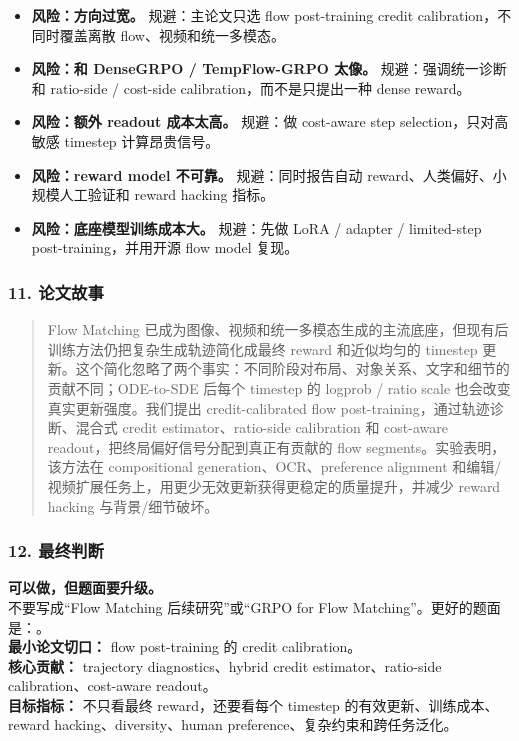 \begin{itemize}[leftmargin=1.5em]
  \item \textbf{风险：方向过宽。} 规避：主论文只选 flow post-training credit calibration，不同时覆盖离散 flow、视频和统一多模态。
  \item \textbf{风险：和 DenseGRPO / TempFlow-GRPO 太像。} 规避：强调统一诊断和 ratio-side / cost-side calibration，而不是只提出一种 dense reward。
  \item \textbf{风险：额外 readout 成本太高。} 规避：做 cost-aware step selection，只对高敏感 timestep 计算昂贵信号。
  \item \textbf{风险：reward model 不可靠。} 规避：同时报告自动 reward、人类偏好、小规模人工验证和 reward hacking 指标。
  \item \textbf{风险：底座模型训练成本大。} 规避：先做 LoRA / adapter / limited-step post-training，并用开源 flow model 复现。
\end{itemize}

\subsubsection*{11. 论文故事}

\begin{quote}
Flow Matching 已成为图像、视频和统一多模态生成的主流底座，但现有后训练方法仍把复杂生成轨迹简化成最终 reward 和近似均匀的 timestep 更新。这个简化忽略了两个事实：不同阶段对布局、对象关系、文字和细节的贡献不同；ODE-to-SDE 后每个 timestep 的 logprob / ratio scale 也会改变真实更新强度。我们提出 credit-calibrated flow post-training，通过轨迹诊断、混合式 credit estimator、ratio-side calibration 和 cost-aware readout，把终局偏好信号分配到真正有贡献的 flow segments。实验表明，该方法在 compositional generation、OCR、preference alignment 和编辑/视频扩展任务上，用更少无效更新获得更稳定的质量提升，并减少 reward hacking 与背景/细节破坏。
\end{quote}

\subsubsection*{12. 最终判断}

\begin{conceptbox}
\textbf{可以做，但题面要升级。}\\
不要写成“Flow Matching 后续研究”或“GRPO for Flow Matching”。更好的题面是：。\\
\textbf{最小论文切口：} flow post-training 的 credit calibration。\\
\textbf{核心贡献：} trajectory diagnostics、hybrid credit estimator、ratio-side calibration、cost-aware readout。\\
\textbf{目标指标：} 不只看最终 reward，还要看每个 timestep 的有效更新、训练成本、reward hacking、diversity、human preference、复杂约束和跨任务泛化。
\end{conceptbox}
